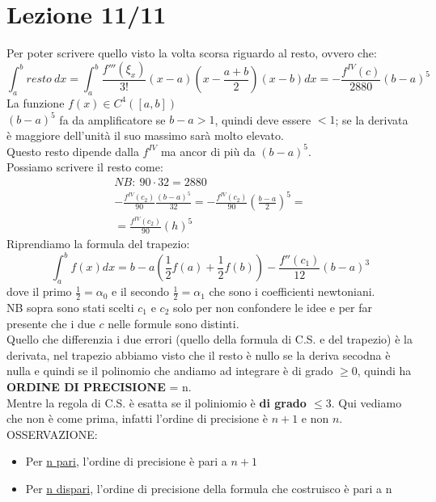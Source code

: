 \documentclass[a4paper, portrait]{book}
\numberwithin{equation}{chapter} %
\begin{document}
\chapter{Lezione 11/11}
Per poter scrivere quello visto la volta scorsa riguardo al resto, ovvero che:
\begin{equation}
    \int_a^b resto \ dx = \int_a^b \frac{f'''(\xi_x)}{3!}(x-a)(x-\frac{a+b}{2})(x-b)dx = -\frac{f^{IV}(c)}{2880}(b-a)^5
\end{equation}
La funzione $f(x) \in C^4 ([a,b])$\\
$(b-a)^5$ fa da amplificatore se $b-a>1$, quindi deve essere $<1$; se la derivata è maggiore dell'unità il suo massimo sarà molto elevato.\\
Questo resto dipende dalla $f^{IV}$ ma ancor di più da $(b-a)^5$.\\
Possiamo scrivere il resto come:
\begin{gather}
    NB: \ 90 \cdot 32 = 2880\\
    -\frac{f^{IV}(c_2)}{90} \frac{(b-a)^5}{32} = -\frac{f^{IV}(c_2)}{90}\left(\frac{b-a}{2}\right)^5 = \\
    = \frac{f^{IV}(c_2)}{90}(h)^5
\end{gather}
Riprendiamo la formula del trapezio:
\begin{equation}
    \int_a^b f(x) dx = b-a(\frac{1}{2}f(a)+\frac{1}{2}f(b)) - \frac{f''(c_1)}{12}(b-a)^3
\end{equation}
dove il primo $\frac{1}{2} = \alpha_0$ e il secondo $\frac{1}{2} = \alpha_1$ che sono i coefficienti newtoniani.\\
NB sopra sono stati scelti $c_1$ e $c_2$ solo per non confondere le idee e per far presente che i due $c$ nelle formule sono distinti.\\
Quello che differenzia i due errori (quello della formula di C.S. e del trapezio) è la derivata, nel trapezio abbiamo visto che il resto è nullo se la deriva secodna è nulla e quindi se il polinomio che andiamo ad integrare è di grado $\geq 0$, quindi ha \textbf{ORDINE DI PRECISIONE} = n.\\
Mentre la regola di C.S. è esatta se il poliniomio è \textbf{di grado $\leq 3$}. Qui vediamo che non è come prima, infatti l'ordine di precisione è $n+1$ e non $n$.\\
OSSERVAZIONE: 
\begin{itemize}
    \item Per \underline{n pari}, l'ordine di precisione è pari a $n+1$
    \item Per \underline{n dispari}, l'ordine di precisione della formula che costruisco è pari a n
\end{itemize}
\end{document}
